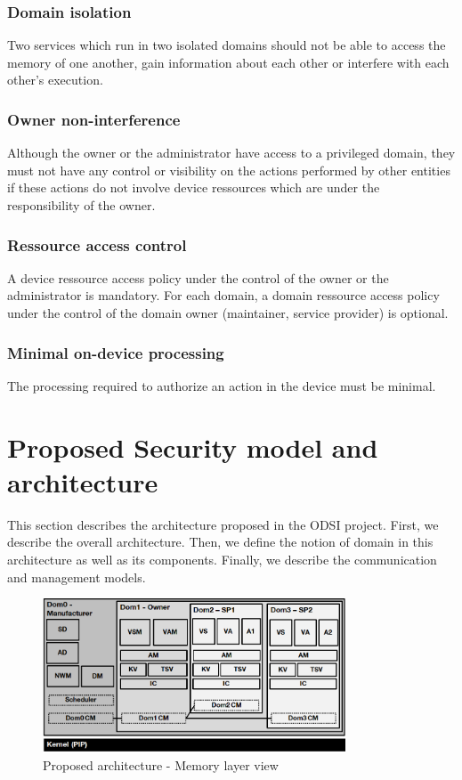 \documentclass[conference]{IEEEtran}
\begin{document}
\subsubsection{Domain isolation}
Two services which run in two isolated domains should not be able to access the memory of one another, gain information about each other or interfere with each other's execution. 

\subsubsection{Owner non-interference}
Although the owner or the administrator have access to a privileged domain, they must not have any control or visibility on the actions performed by other entities if these actions do not involve device ressources which are under the responsibility of the owner.

\subsubsection{Ressource access control}
A device ressource access policy under the control of the owner or the administrator is mandatory. For each domain, a domain ressource access policy under the control of the domain owner (maintainer, service provider) is optional. 

\subsubsection{Minimal on-device processing}
The processing required to authorize an action in the device must be minimal. 

\section{Proposed Security model and architecture}
\label{sec:Architecture}
This section describes the architecture proposed in the ODSI project. First, we describe the overall architecture. Then, we define the notion of domain in this architecture as well as its components. Finally, we describe the communication and management models.


\begin{figure}[t]
\centering
\includegraphics[width=9cm]{figures/mem_layout.png}
\caption{Proposed architecture - Memory layer view}
\label{fig:Arch_mem}
\end{figure}
\end{document}
